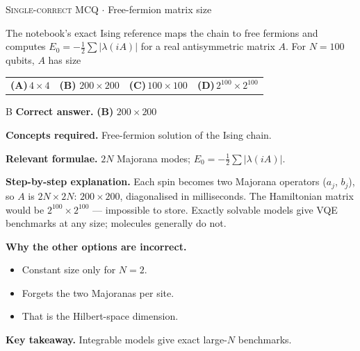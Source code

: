 \documentclass[11pt,a4paper]{article}
\newcommand{\optlabel}[1]{\textbf{(#1)}}
\newcommand{\correctlabel}[1]{\textcolor{okgreen}{\textbf{(#1)}\,\ding{51}}}
\newenvironment{qitem}[1]{\begin{list}{}{\setlength{\leftmargin}{3.3em}\setlength{\labelwidth}{3.1em}%
  \setlength{\labelsep}{0.2em}\setlength{\topsep}{3pt}\setlength{\parsep}{3pt}}\item[\textbf{Q.#1}\hfill]}{\end{list}}
\newcommand{\qsep}{\par\vspace{2pt}{\color{black!15}\hrule}\vspace{4pt}}
\newcommand{\qmeta}[2]{{\footnotesize\color{black!60}\textsc{#1} \;$\cdot$\; #2}\par}
\begin{document}
\begin{qitem}{75}
\qmeta{Single-correct MCQ}{Free-fermion matrix size}
The notebook's exact Ising reference maps the chain to free fermions and computes $E_0 = -\tfrac12\sum|\lambda(iA)|$ for a real antisymmetric matrix $A$. For
$N = 100$ qubits, $A$ has size
\par\smallskip\noindent\begin{tabularx}{\linewidth}{@{}*{4}{L}@{}}
\optlabel{A}\,$4\times4$ & \correctlabel{B}\,$200\times200$ & \optlabel{C}\,$100\times100$ & \optlabel{D}\,$2^{100}\times2^{100}$
\end{tabularx}
\end{qitem}
\begin{solbox}{B}
\textbf{\color{brand}Correct answer.} \textcolor{okgreen}{\textbf{(B)}} $200\times200$

\textbf{\color{brand}Concepts required.} Free-fermion solution of the Ising chain.

\textbf{\color{brand}Relevant formulae.} $2N$ Majorana modes; $E_0 = -\frac12\sum|\lambda(iA)|$.

\textbf{\color{brand}Step-by-step explanation.} Each spin becomes two Majorana operators ($a_j$, $b_j$), so $A$ is $2N\times2N$: $200\times200$, diagonalised in milliseconds. The Hamiltonian matrix
would be $2^{100}\times2^{100}$ --- impossible to store. Exactly solvable models give VQE benchmarks at any size; molecules generally do not.

\textbf{\color{brand}Why the other options are incorrect.}
\begin{itemize}[leftmargin=2.4em, itemsep=1pt, topsep=2pt]
\item[\textbf{(A)}] Constant size only for $N = 2$.
\item[\textbf{(C)}] Forgets the two Majoranas per site.
\item[\textbf{(D)}] That is the Hilbert-space dimension.
\end{itemize}
\textbf{\color{brand}Key takeaway.} Integrable models give exact large-$N$ benchmarks.
\end{solbox}
\qsep
\end{document}
